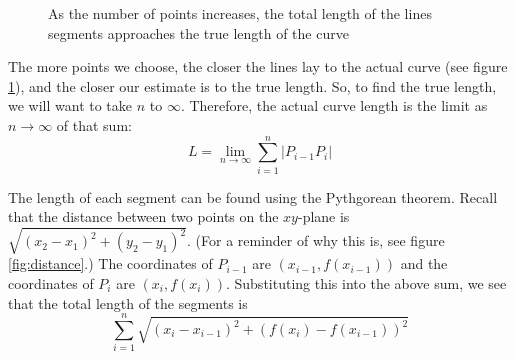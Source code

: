 \begin{figure}[htbp]
\centering
    \caption{As the number of points increases, the total length of the lines segments approaches the true length of the curve}
    \label{fig:points}
\end{figure}

The more points we choose, the closer the lines lay to the actual 
curve (see figure \ref{fig:points}), and the closer our estimate is 
to the true length. So, to find the true length, we will want to take 
$n$ to $\infty$. Therefore, the actual curve length is the limit as 
$n \to \infty$ of that sum:
$$L = \lim_{n \to \infty}\sum_{i=1}^n |P_{i-1}P_i|$$

The length of each segment can be found using the Pythgorean theorem. 
Recall that the distance between two points on the $xy$-plane is 
$\sqrt{(x_2 - x_1)^2 + (y_2 - y_1)^2}$. (For a reminder of why this 
is, see figure \ref{fig:distance}.) The coordinates of $P_{i-1}$ are 
$(x_{i-1}, f(x_{i-1}))$ and the coordinates of $P_i$ are $(x_i, 
f(x_i))$. Substituting this into the above sum, we see that the total 
length of the segments is 
$$\sum_{i=1}^n \sqrt{(x_i - x_{i-1})^2 + (f(x_i) - f(x_{i-1}))^2}$$


